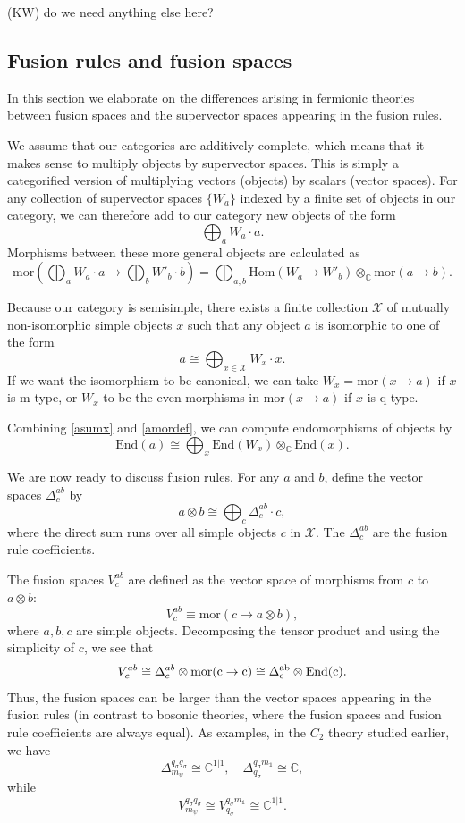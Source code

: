 \documentclass[12pt,a4paper]{article}
\newcounter{arrow}
\newcommand{\tp}{\otimes}
\newcommand{\ra}{\rightarrow}
\newcommand{\unit}{\mathds{1}}
\newcommand{\cc}{\mathbb{C}}
\newcommand{\mcx}{\mathcal{X}}
\newcommand\be            {\begin{equation}}
\newcommand\ee            {\end{equation}}
\newcommand{\Hom}{\text{Hom}}
\newcommand{\mor}{\text{mor}}
\newcommand{\End}{\text{End}}
\newcommand{\kw}[1]{{\color{kwcolor}\footnotesize{(KW) #1}}}
\begin{document}
\medskip
\kw{do we need anything else here?}



\subsection{Fusion rules and fusion spaces} \label{fusion_rules_and_fusion_spaces}


In this section we elaborate on the differences arising in fermionic theories between fusion spaces and the supervector spaces appearing in the fusion rules. 

We assume that our categories are additively complete, which means that it makes sense to
multiply objects by supervector spaces. 
This is simply a categorified version of multiplying vectors (objects) by scalars (vector spaces).
For any collection of supervector spaces $\{W_a\}$ indexed by 
a finite set of objects in our category, 
we can therefore add to our category new objects of the form
\be \bigoplus_a W_a \cdot a.\ee
Morphisms between these more general objects are calculated as  
\be  \label{amordef}
	\mor(\bigoplus_a W_a\cdot a \to \bigoplus_b W'_b\cdot b) = \bigoplus_{a,b} \Hom(W_a \to W'_b)\otimes_\cc \mor(a\to b) .
\ee

Because our category is semisimple, there exists a finite collection $\mcx$ of mutually non-isomorphic simple objects $x$ such
that any object $a$ is isomorphic to one of the form
\be \label{asumx}
	a \cong \bigoplus_{x\in \mcx} W_x\cdot x .
\ee
If we want the isomorphism to be canonical, we can take $W_x = \mor(x\to a)$ if $x$ is m-type, or $W_x$ to be the even morphisms in $\mor(x\to a)$
if $x$ is q-type.

Combining \eqref{asumx} and \eqref{amordef}, we can compute endomorphisms of objects by
\be
	\End(a) \cong \bigoplus_x \End(W_x) \otimes_\cc \End(x).
\ee

We are now ready to discuss fusion rules. 
For any $a$ and $b$, define the vector spaces $\Delta^{ab}_c$ by
\be
	a \otimes b \cong \bigoplus_c \Delta^{ab}_c \cdot c ,
\ee
where the direct sum runs over all simple objects $c$ in $\mcx$. 
The $\Delta^{ab}_c$ are the fusion rule coefficients. 

The fusion spaces $V^{ab}_c$ are defined as the vector space of morphisms from $c$ to $a\tp b$:
\be \label{defn_of_V_by_Delta}
	V^{ab}_c \equiv \mor(c \to a\tp b),
\ee
where $a,b,c$ are simple objects. 
Decomposing the tensor product and using the simplicity of $c$, we see that 
\be V^{ab}_c \cong \Delta^{ab}_c \tp \rm{mor}(c \ra c) \cong \Delta^{ab}_c \otimes \End(c).\ee
Thus, the fusion spaces can be larger than the vector spaces appearing in the fusion rules 
(in contrast to bosonic theories, where the fusion spaces and fusion rule coefficients are always equal).
As examples, in the $C_2$ theory studied earlier, we have 
\be \Delta^{q_\sigma q_\sigma}_{m_\psi} \cong \cc^{1|1},\quad\Delta^{q_\sigma m_\unit}_{q_\sigma} \cong \cc,\ee
while 
\be V^{q_\sigma q_\sigma}_{m_\psi} \cong V^{q_\sigma m_\unit}_{q_\sigma} \cong \cc^{1|1}.\ee
\end{document}

